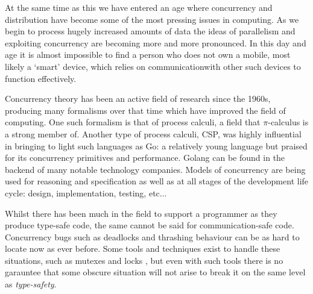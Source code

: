 \documentclass[11pt, abstracton, twoside, titlepage=true]{scrartcl}
\begin{document}
At the same time as this we have entered an age where concurrency and 
distribution have become some of the most pressing issues in computing. As we 
begin to process hugely increased amounts of data the ideas of parallelism and 
exploiting concurrency are becoming more and more pronounced. In this day and age
it is almost impossible to find a person who does not own a mobile, most likely a 
`smart' device, which relies on communicationwith other such devices to function 
effectively. 

Concurrency theory has been an active field of research since the 1960s, producing
many formalisms over that time which have improved the field of computing. One 
such formalism is that of process calculi, a field that $\pi$-calculus is a strong
member of. Another type of process calculi, CSP, was highly influential in 
bringing to light such languages as Go: a relatively young language but praised
for its concurrency primitives and performance. Golang can be found in the backend
of many notable technology companies. Models of concurrency are being used for
reasoning and specification as well as at all stages of the development life
cycle: design, implementation, testing, etc...

Whilst there has been much in the field to support a programmer as they produce
type-safe code, the same cannot be said for communication-safe code. Concurrency
bugs such as deadlocks and thrashing behaviour can be as hard to locate now as
ever before. Some tools and techniques exist to handle these situations, such as
mutexes and locks \cite{T95}, but even with such tools there is no garauntee
that some obscure situation will not arise to break it on the same level as 
\emph{type-safety}.

\end{document}
